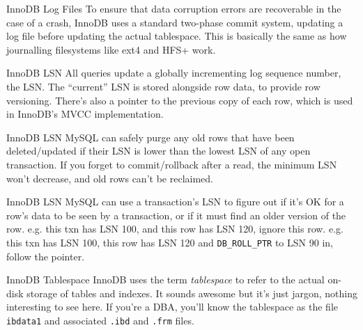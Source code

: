\documentclass[14pt]{beamer}
\begin{document}
\begin{frame}{InnoDB Log Files}
  To ensure that data corruption errors are recoverable in the case of a crash,
  InnoDB uses a standard two-phase commit system, updating a log file before
  updating the actual tablespace.
  \newline
  \newline
  This is basically the same as how journalling filesystems like ext4 and HFS+ work.
\end{frame}

\begin{frame}{InnoDB LSN}
  All queries update a globally incrementing log sequence number, the LSN. The
  ``current'' LSN is stored alongside row data, to provide row versioning.
  \newline
  \newline
  There's also a pointer to the previous copy of each row, which is used in
  InnoDB's MVCC implementation.
\end{frame}

\begin{frame}{InnoDB LSN}
  MySQL can safely purge any old rows that have been deleted/updated if their
  LSN is lower than the lowest LSN of any open transaction.
  \newline
  \newline
  If you forget to commit/rollback after a read, the minimum LSN won't decrease,
  and old rows can't be reclaimed.
\end{frame}

\begin{frame}{InnoDB LSN}
  MySQL can use a transaction's LSN to figure out if it's OK for a row's data to
  be seen by a transaction, or if it must find an older version of the
  row.
  \pause
  \newline
  \newline
  e.g. this txn has LSN 100, and this row has LSN 120, ignore this row.
  \pause
  \newline
  \newline
  e.g. this txn has LSN 100, this row has LSN 120 and \texttt{DB\_ROLL\_PTR} to
  LSN 90 in, follow the pointer.
\end{frame}

\begin{frame}{InnoDB Tablespace}
  InnoDB uses the term \emph{tablespace} to refer to the actual on-disk storage
  of tables and indexes. It sounds awesome but it's just jargon, nothing
  interesting to see here.
  \newline
  \newline
  If you're a DBA, you'll know the tablespace as the file \texttt{ibdata1} and
  associated \texttt{.ibd} and \texttt{.frm} files.
\end{frame}
\end{document}
